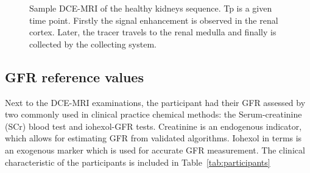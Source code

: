 \begin{figure}[H]
			\hspace{0.005\linewidth}
		\hspace{0.005\linewidth}
	\hspace{0.005\linewidth}
\vspace{0.5cm}
\caption[Sample DCE-MRI sequence of the healthy kidneys.]{Sample DCE-MRI of the healthy kidneys sequence. Tp is a given time point. Firstly the signal enhancement is observed in the renal cortex. Later, the tracer travels to the renal medulla and finally is collected by the collecting system.}
\label{fig:set}
\end{figure}


\subsection{GFR reference values}
Next to the DCE-MRI examinations, the participant had their GFR assessed by two commonly used in clinical practice chemical methods: the Serum-creatinine (SCr) blood test and iohexol-GFR tests. Creatinine is an endogenous indicator, which allows for estimating GFR from validated algorithms.
Iohexol in terms is an exogenous marker which is used for accurate GFR measurement. The clinical characteristic of the participants is included in Table~\ref{tab:participants}

